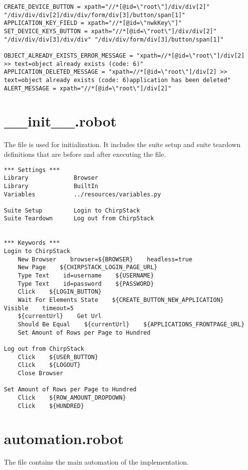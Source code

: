 \begin{verbatim}
CREATE_DEVICE_BUTTON = xpath="//*[@id=\"root\"]/div/div[2]" "/div/div/div[2]/div/div/form/div[3]/button/span[1]"
APPLICATION_KEY_FIELD = xpath="//*[@id=\"nwkKey\"]"
SET_DEVICE_KEYS_BUTTON = xpath="//*[@id=\"root\"]/div/div[2]" "/div/div/div[3]/div/div" "/div/div/form/div[3]/button/span[1]"

OBJECT_ALREADY_EXISTS_ERROR_MESSAGE = "xpath=//*[@id=\"root\"]/div[2] >> text=object already exists (code: 6)"
APPLICATION_DELETED_MESSAGE = "xpath=//*[@id=\"root\"]/div[2] >> text=object already exists (code: 6)application has been deleted"
ALERT_MESSAGE = xpath="//*[@id=\"root\"]/div[2]"
\end{verbatim}


\section{\_\_init\_\_.robot}

The  file is used for initialization.
It includes the suite setup and suite teardown definitions that are before and after executing the  file.

\begin{verbatim}
*** Settings ***
Library             Browser
Library             BuiltIn
Variables           ../resources/variables.py

Suite Setup         Login to ChirpStack
Suite Teardown      Log out from ChirpStack


*** Keywords ***
Login to ChirpStack
    New Browser    browser=${BROWSER}    headless=true
    New Page    ${CHIRPSTACK_LOGIN_PAGE_URL}
    Type Text    id=username    ${USERNAME}
    Type Text    id=password    ${PASSWORD}
    Click    ${LOGIN_BUTTON}
    Wait For Elements State    ${CREATE_BUTTON_NEW_APPLICATION}    Visible    timeout=5
    ${currentUrl}    Get Url
    Should Be Equal    ${currentUrl}    ${APPLICATIONS_FRONTPAGE_URL}
    Set Amount of Rows per Page to Hundred

Log out from ChirpStack
    Click    ${USER_BUTTON}
    Click    ${LOGOUT}
    Close Browser

Set Amount of Rows per Page to Hundred
    Click    ${ROW_AMOUNT_DROPDOWN}
    Click    ${HUNDRED}

\end{verbatim}

\section{automation.robot}
The  file contains the main automation of the implementation.

